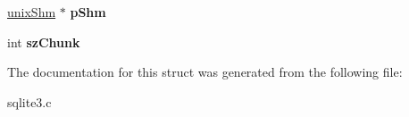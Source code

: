\begin{DoxyCompactItemize}
\item 
\hypertarget{structunix_file_a53c653bd73cdc6f518ecffe95062e91a}{\hyperlink{structunix_shm}{unix\-Shm} $\ast$ {\bfseries p\-Shm}}\label{structunix_file_a53c653bd73cdc6f518ecffe95062e91a}

\item 
\hypertarget{structunix_file_a5f6307d3446ce1b149df756c00c3bd2e}{int {\bfseries sz\-Chunk}}\label{structunix_file_a5f6307d3446ce1b149df756c00c3bd2e}

\end{DoxyCompactItemize}


The documentation for this struct was generated from the following file\-:\begin{DoxyCompactItemize}
\item 
sqlite3.\-c\end{DoxyCompactItemize}
